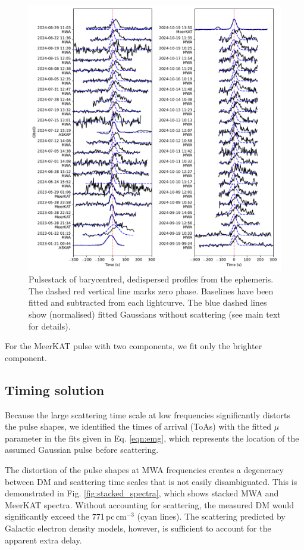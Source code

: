 \documentclass[preprint2,linenumbers]{aastex631}
\begin{document}
\begin{figure}[tp]
      \centering
          \includegraphics[width=0.9\linewidth]{pulsestack.pdf}
              \caption{Pulsestack of barycentred, dedispersed profiles from the ephemeris. The dashed red vertical line marks zero phase. Baselines have been fitted and subtracted from each lightcurve. The blue dashed lines show (normalised) fitted Gaussians without scattering (see main text for details).}
                  \label{fig:pulsestack}
\end{figure}

For the MeerKAT pulse with two components, we fit only the brighter component.

\subsection{Timing solution} \label{sec:timing}

Because the large scattering time scale at low frequencies significantly distorts the pulse shapes, we identified the times of arrival (ToAs) with the fitted $\mu$ parameter in the fits given in Eq. \eqref{eqn:emg}, which represents the location of the assumed Gaussian pulse before scattering.

The distortion of the pulse shapes at MWA frequencies creates a degeneracy between DM and scattering time scales that is not easily disambiguated.
This is demonstrated in Fig. \ref{fig:stacked_spectra}, which shows stacked MWA and MeerKAT spectra.
Without accounting for scattering, the measured DM would significantly exceed the 771\,pc\,cm$^{-3}$ (cyan lines).
The scattering predicted by Galactic electron density models, however, is sufficient to account for the apparent extra delay.
\end{document}
